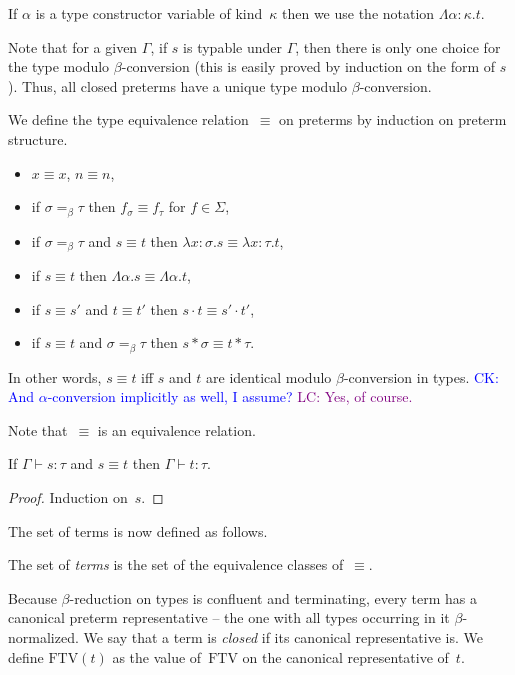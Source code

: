\documentclass[runningheads,a4paper]{llncs}
\newcommand{\abs}[2]{\lambda #1.#2}
\newcommand{\tabs}[2]{\Lambda #1.#2}
\newcommand{\tapp}[2]{#1 * #2}
\newcommand{\FTV}{\mathrm{FTV}}
\newcommand{\CK}[1]{\textcolor{blue}{CK: #1}}
\newcommand{\LC}[1]{\textcolor{purple}{LC: #1}}
\begin{document}
If $\alpha$ is a type constructor variable of kind~$\kappa$ then we
use the notation $\tabs{\alpha:\kappa}{t}$.

Note that for a given $\Gamma$, if $s$ is typable under $\Gamma$, then
there is only one choice for the type modulo $\beta$-conversion (this
is easily proved by induction on the form of $s$). Thus, all closed
preterms have a unique type modulo $\beta$-conversion.

\begin{definition}\label{def_type_equiv}
  We define the type equivalence relation~$\equiv$ on preterms by
  induction on preterm structure.
  \begin{itemize}
  \item $x \equiv x$, $n \equiv n$,
  \item if $\sigma =_\beta \tau$ then $f_\sigma \equiv f_\tau$ for
    $f \in \Sigma$,
  \item if $\sigma =_\beta \tau$ and $s \equiv t$ then
    $\abs{x:\sigma}{s} \equiv \abs{x:\tau}{t}$,
  \item if $s \equiv t$ then $\tabs{\alpha}{s} \equiv
    \tabs{\alpha}{t}$,
  \item if $s \equiv s'$ and $t \equiv t'$ then $s \cdot t \equiv s'
    \cdot t'$,
  \item if $s \equiv t$ and $\sigma =_\beta \tau$ then
    $\tapp{s}{\sigma} \equiv \tapp{t}{\tau}$.
  \end{itemize}
  In other words, $s \equiv t$ iff $s$ and $t$ are identical modulo
  $\beta$-conversion in types.
  \CK{And $\alpha$-conversion implicitly as well, I assume?}
  \LC{Yes, of course.}
\end{definition}

Note that~$\equiv$ is an equivalence relation.

\begin{lemma}
  If $\Gamma \vdash s : \tau$ and $s \equiv t$ then $\Gamma \vdash t :
  \tau$.
\end{lemma}

\begin{proof}
  Induction on~$s$.
\end{proof}

The set of terms is now defined as follows.

\begin{definition}\label{def_terms}\normalfont
  The set of \emph{terms} is the set of the equivalence classes
  of~$\equiv$.
\end{definition}

Because $\beta$-reduction on types is confluent and terminating, every
term has a canonical preterm representative -- the one with all types
occurring in it $\beta$-normalized. We say that a term is
\emph{closed} if its canonical representative is. We define $\FTV(t)$
as the value of~$\FTV$ on the canonical representative of~$t$.
\end{document}
